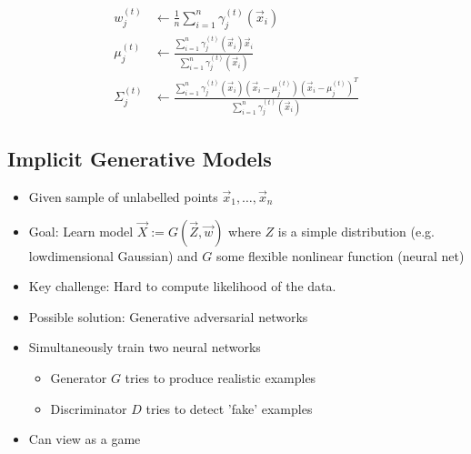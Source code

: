 \documentclass[8pt,a4paper]{scrartcl}
\begin{document}
\begin{multicols*}{3}
\begin{itemize}
\begin{enumerate}
\begin{align*}
w_j^{(t)}&\leftarrow \frac{1}{n}\sum\limits_{i=1}^n \gamma_j^{(t)}(\vec{x}_i)\\
\mu_j^{(t)}&\leftarrow \frac{\sum\limits_{i=1}^n\gamma_j^{(t)}(\vec{x}_i)\vec{x}_i}{\sum\limits_{i=1}^n\gamma_j^{(t)}(\vec{x}_i)}\\
\Sigma_j^{(t)}&\leftarrow\frac{\sum\limits_{i=1}^n\gamma_j^{(t)}(\vec{x}_i)(\vec{x}_i-\mu_j^{(t)})(\vec{x}_i-\mu_j^{(t)})^T}{\sum\limits_{i=1}^n\gamma_j^{(t)}(\vec{x}_i)}
\end{align*}
\end{enumerate}
\end{itemize}

\subsection{Implicit Generative Models}

\begin{itemize}
\ncompaq
\item Given sample of unlabelled points $\vec{x}_1,\ldots,\vec{x}_n$
\item Goal: Learn model $\vec{X}:=G(\vec{Z},\vec{w})$ where $Z$ is a simple distribution (e.g. lowdimensional Gaussian) and $G$ some flexible nonlinear function (neural net)
\item Key challenge: Hard to compute likelihood of the data.
\item Possible solution: Generative adversarial networks
\end{itemize}


\begin{itemize}[leftmargin=*]
\ncompaq
\item Simultaneously train two neural networks
\begin{itemize}
\ncompaq
\item Generator $G$ tries to produce realistic examples
\item Discriminator $D$ tries to detect 'fake' examples
\end{itemize}
\item Can view as a game


\end{itemize}
\end{multicols*}
\end{document}
